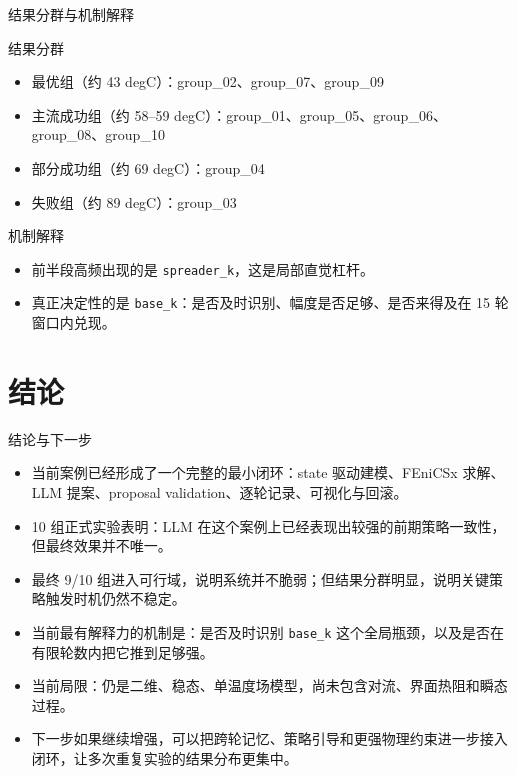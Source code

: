 \documentclass[aspectratio=169]{ctexbeamer}
\begin{document}
\begin{frame}{结果分群与机制解释}
\small
\begin{block}{结果分群}
\begin{itemize}
\item 最优组（约 43 degC）：group\_02、group\_07、group\_09
\item 主流成功组（约 58--59 degC）：group\_01、group\_05、group\_06、group\_08、group\_10
\item 部分成功组（约 69 degC）：group\_04
\item 失败组（约 89 degC）：group\_03
\end{itemize}
\end{block}
\begin{block}{机制解释}
\begin{itemize}
\item 前半段高频出现的是 \texttt{spreader\_k}，这是局部直觉杠杆。
\item 真正决定性的是 \texttt{base\_k}：是否及时识别、幅度是否足够、是否来得及在 15 轮窗口内兑现。
\end{itemize}
\end{block}
\end{frame}

\section{结论}

\begin{frame}{结论与下一步}
\begin{itemize}
\item 当前案例已经形成了一个完整的最小闭环：state 驱动建模、FEniCSx 求解、LLM 提案、proposal validation、逐轮记录、可视化与回滚。
\item 10 组正式实验表明：LLM 在这个案例上已经表现出较强的前期策略一致性，但最终效果并不唯一。
\item 最终 9/10 组进入可行域，说明系统并不脆弱；但结果分群明显，说明关键策略触发时机仍然不稳定。
\item 当前最有解释力的机制是：是否及时识别 \texttt{base\_k} 这个全局瓶颈，以及是否在有限轮数内把它推到足够强。
\item 当前局限：仍是二维、稳态、单温度场模型，尚未包含对流、界面热阻和瞬态过程。
\item 下一步如果继续增强，可以把跨轮记忆、策略引导和更强物理约束进一步接入闭环，让多次重复实验的结果分布更集中。
\end{itemize}
\end{frame}
\end{document}

